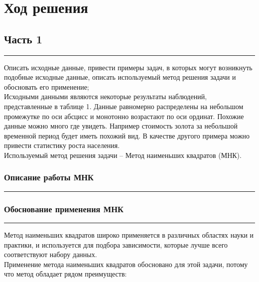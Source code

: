\documentclass[a4paper, 14pt]{extarticle}
\begin{document}
\section*{{Ход решения}}

\subsection*{{Часть 1}}\vspace{-20pt}\rule{\linewidth}{0.1mm}

\vspace{-10pt} Описать исходные данные, привести примеры задач, в которых могут возникнуть 
подобные исходные данные, описать используемый метод решения задачи и обосновать его 
применение;\\

Исходными данными являются некоторые результаты наблюдений, представленные в таблице 1. Данные 
равномерно распределены на небольшом промежутке по оси абсцисс и монотонно возрастают по оси ординат. 
Похожие данные можно много где увидеть. Например стоимость золота за небольшой временной период будет 
иметь похожий вид. В качестве другого примера можно привести статистику роста населения.\\

Используемый метод решения задачи – Метод наименьших квадратов (МНК).\\

\subsubsection*{{Описание работы МНК}}\vspace{-20pt}\rule{\linewidth}{0.1mm}

\subsubsection*{{Обоснование применения МНК}}\vspace{-20pt}\rule{\linewidth}{0.1mm}

Метод наименьших квадратов широко применяется в различных областях науки и практики, 
и используется для подбора зависимости, которые лучше всего соответствуют набору данных. \\

Применение метода наименьших квадратов обосновано для этой задачи, потому что метод 
обладает рядом преимуществ: \\
\end{document}
